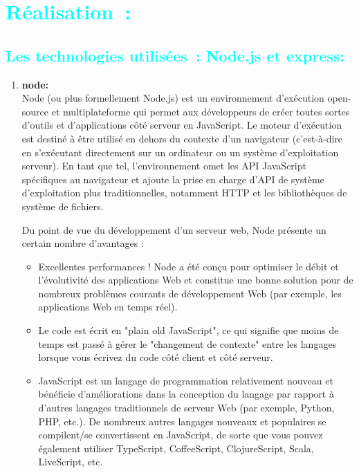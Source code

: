 \section{\textcolor{cyan}{Réalisation :}}
\subsection{\textcolor{cyan}{Les technologies utilisées : Node.js et express:}}
\begin{enumerate}[label=(\alph*)]
    \item \textbf{node:}\\
    Node (ou plus formellement Node.js) est un environnement d'exécution open-source et multiplateforme qui permet aux développeurs de créer toutes sortes d'outils et d'applications côté serveur en JavaScript. Le moteur d'exécution est destiné à être utilisé en dehors du contexte d'un navigateur (c'est-à-dire en s'exécutant directement sur un ordinateur ou un système d'exploitation serveur). En tant que tel, l'environnement omet les API JavaScript spécifiques au navigateur et ajoute la prise en charge d'API de système d'exploitation plus traditionnelles, notamment HTTP et les bibliothèques de système de fichiers.\par
Du point de vue du développement d'un serveur web, Node présente un certain nombre d'avantages :\par
\begin{itemize}
    \item Excellentes performances ! Node a été conçu pour optimiser le débit et l'évolutivité des applications Web et constitue une bonne solution pour de nombreux problèmes courants de développement Web (par exemple, les applications Web en temps réel).\par
    \item Le code est écrit en "plain old JavaScript", ce qui signifie que moins de temps est passé à gérer le "changement de contexte" entre les langages lorsque vous écrivez du code côté client et côté serveur.\par
    \item JavaScript est un langage de programmation relativement nouveau et bénéficie d'améliorations dans la conception du langage par rapport à d'autres langages traditionnels de serveur Web (par exemple, Python, PHP, etc.). De nombreux autres langages nouveaux et populaires se compilent/se convertissent en JavaScript, de sorte que vous pouvez également utiliser TypeScript, CoffeeScript, ClojureScript, Scala, LiveScript, etc.\par

\end{itemize}
\end{enumerate}
